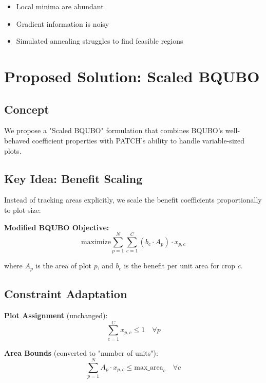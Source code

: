 \documentclass[11pt,a4paper]{article}
\begin{document}
\begin{itemize}
    \item Local minima are abundant
    \item Gradient information is noisy
    \item Simulated annealing struggles to find feasible regions
\end{itemize}

\section{Proposed Solution: Scaled BQUBO}

\subsection{Concept}

We propose a "Scaled BQUBO" formulation that combines BQUBO's well-behaved coefficient properties with PATCH's ability to handle variable-sized plots.

\subsection{Key Idea: Benefit Scaling}

Instead of tracking areas explicitly, we scale the benefit coefficients proportionally to plot size:

\textbf{Modified BQUBO Objective:}
\begin{equation}
\text{maximize} \sum_{p=1}^{N} \sum_{c=1}^{C} (b_c \cdot A_p) \cdot x_{p,c}
\end{equation}

where $A_p$ is the area of plot $p$, and $b_c$ is the benefit per unit area for crop $c$.

\subsection{Constraint Adaptation}

\textbf{Plot Assignment} (unchanged):
\begin{equation}
\sum_{c=1}^{C} x_{p,c} \leq 1 \quad \forall p
\end{equation}

\textbf{Area Bounds} (converted to "number of units"):
\begin{equation}
\sum_{p=1}^{N} A_p \cdot x_{p,c} \leq \text{max\_area}_c \quad \forall c
\end{equation}
\end{document}
